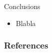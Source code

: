 \documentclass[handout]{beamer}
\begin{document}
\begin{frame}{Conclusions}
\scriptsize{

\begin{itemize}
\item Blabla
\end{itemize}


} 
\end{frame}


\begin{frame}[allowframebreaks]\scriptsize
\frametitle{References}


%
\end{frame}  









\end{document}
